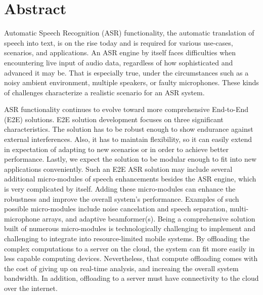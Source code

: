 \chapter*{Abstract}
\vspace*{-1cm}
Automatic Speech Recognition (ASR) functionality,
the automatic translation of
speech into text, 
is on the rise today and is required for 
various use-cases,
scenarios, and applications.
An ASR engine by itself faces difficulties 
when encountering live input of audio data, 
regardless of how sophisticated and advanced it may be.
That is especially true, 
under the circumstances 
such as a noisy ambient environment,
multiple speakers, or faulty microphones.
These kinds of challenges characterize 
a realistic scenario for an ASR system.

ASR functionality continues to evolve 
toward more comprehensive End-to-End (E2E) solutions.
E2E solution development focuses on three significant characteristics. 
The solution has to be robust enough to show endurance against external interferences. 
Also, it has to maintain flexibility, so it can easily extend in expectation of adapting to new scenarios or in order to achieve better performance.
Lastly, we expect the solution to be modular enough to fit into new applications conveniently.
Such an E2E ASR solution may include 
several additional micro-modules 
of speech enhancements besides the ASR engine, 
which is very complicated by itself. 
Adding these micro-modules can enhance the robustness 
and improve the overall system's performance.
Examples of such possible micro-modules include 
noise cancelation and speech separation, 
multi-microphone arrays, and adaptive beamformer(s).
Being a comprehensive solution built of
numerous micro-modules is technologically 
challenging to implement
and challenging to integrate into resource-limited
mobile systems. 
By offloading the complex computations to a server
on the cloud, 
the system can fit more easily in less capable computing devices. 
Nevertheless, that compute offloading comes with the cost of
giving up on real-time analysis,
and increaing the overall system bandwidth. 
In addition, offloading to a server must have
connectivity to the cloud over the internet.


